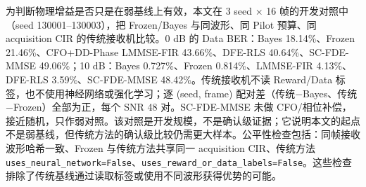为判断物理增益是否只是在弱基线上有效，本文在 3 seed × 16 帧的开发对照中（seed 130001–130003），把 Frozen/Bayes 与同波形、同 Pilot 预算、同 acquisition CIR 的传统接收机比较。0 dB 的 Data BER：Bayes 18.14\%、Frozen 21.46\%、CFO+DD-Phase LMMSE-FIR 43.66\%、DFE-RLS 40.64\%、SC-FDE-MMSE 49.06\%；10 dB：Bayes 0.727\%、Frozen 0.814\%、LMMSE-FIR 4.13\%、DFE-RLS 3.59\%、SC-FDE-MMSE 48.42\%。传统接收机不读 Reward/Data 标签，也不使用神经网络或强化学习；逐 (seed, frame) 配对差（传统−Bayes、传统−Frozen）全部为正，每个 SNR 48 对。SC-FDE-MMSE 未做 CFO/相位补偿，接近随机，只作弱对照。该对照是开发规模，不是确认级证据；它说明本文的起点不是弱基线，但传统方法的确认级比较仍需更大样本。公平性检查包括：同帧接收波形哈希一致、Frozen 与传统方法共享同一 acquisition CIR、传统方法 \texttt{uses\_neural\_network=False}、\texttt{uses\_reward\_or\_data\_labels=False}。这些检查排除了传统基线通过读取标签或使用不同波形获得优势的可能。
